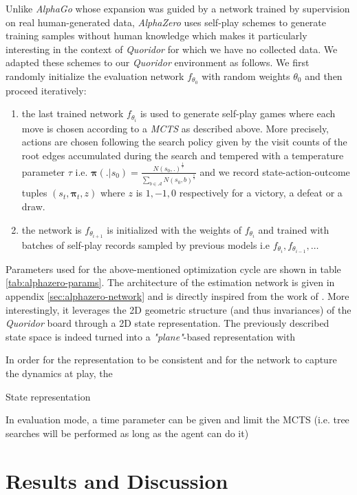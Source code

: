 \documentclass[journal, a4paper]{IEEEtran}
\begin{document}
    Unlike \textit{AlphaGo}\cite{alphago} whose expansion was guided by a network trained by supervision on real human-generated data, \textit{AlphaZero} uses self-play schemes to generate training samples without human knowledge which makes it particularly interesting in the context of \textit{Quoridor} for which we have no collected data. We adapted these schemes to our \textit{Quoridor} environment as follows. We first randomly initialize the evaluation network $f_{\theta_0}$ with random weights $\theta_0$ and then proceed iteratively:
    \begin{enumerate}
        \item the last trained network $f_{\theta_i}$ is used to generate self-play games where each move is chosen according to a \textit{MCTS} as described above. More precisely, actions are chosen following the search policy given by the visit counts of the root edges accumulated during the search and tempered with a temperature parameter $\tau$ i.e. $\mathbf{\pi}(.|s_0)=\frac{N(s_0,.)^\frac{1}{\tau}}{\sum_{b\in\mathcal{A}}N(s_0, b)^\frac{1}{\tau}}$ and we record state-action-outcome tuples $(s_t, \mathbf{\pi}_t, z)$ where $z$ is $1, -1, 0$ respectively for a victory, a defeat or a draw.
        \item the network is $f_{\theta_{i+1}}$ is initialized with the weights of $f_{\theta_i}$ and trained with batches of self-play records sampled by previous models i.e $f_{\theta_i}, f_{\theta_{i-1}}, \ldots$
    \end{enumerate} 

    Parameters used for the above-mentioned optimization cycle are shown in table \ref{tab:alphazero-params}. The architecture of the estimation network is given in appendix \ref{sec:alphazero-network} and is directly inspired from the work of \cite{alphazero}. More interestingly, it leverages the 2D geometric structure (and thus invariances) of the \textit{Quoridor} board through a 2D state representation. The previously described state space is indeed turned into a \textit{"plane"}-based representation with  

     In order for the representation to be consistent and for the network to capture the dynamics at play, the

    State representation 


In evaluation mode, a time parameter can be given and limit the MCTS (i.e. tree searches will be performed as long as the agent can do it)


\section{Results and Discussion}
\label{sec:results}
\end{document}
